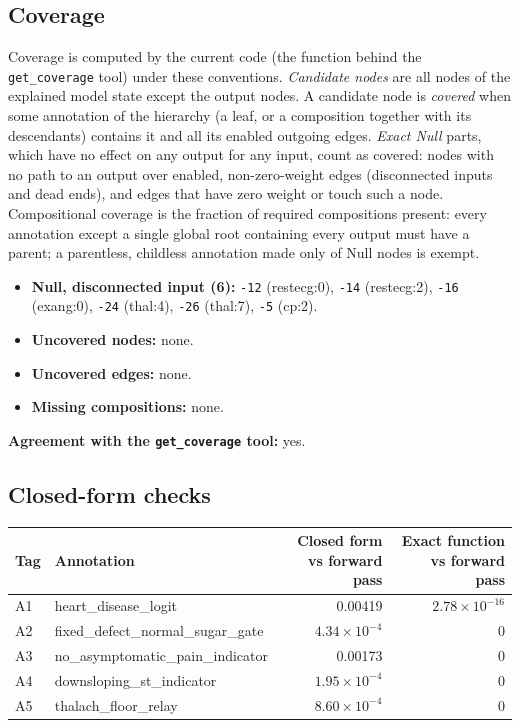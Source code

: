 \begin{drafted}
\subsection{Coverage}\label{app:heart-s4-c1:coverage}
Coverage is computed by the current code (the function behind the \texttt{get\_coverage} tool) under these conventions. \emph{Candidate nodes} are all nodes of the explained model state except the output nodes. A candidate node is \emph{covered} when some annotation of the hierarchy (a leaf, or a composition together with its descendants) contains it and all its enabled outgoing edges. \emph{Exact Null} parts, which have no effect on any output for any input, count as covered: nodes with no path to an output over enabled, non-zero-weight edges (disconnected inputs and dead ends), and edges that have zero weight or touch such a node. Compositional coverage is the fraction of required compositions present: every annotation except a single global root containing every output must have a parent; a parentless, childless annotation made only of Null nodes is exempt.

\begin{itemize}
\item \textbf{Null, disconnected input (6):} \texttt{-12} (restecg:0), \texttt{-14} (restecg:2), \texttt{-16} (exang:0), \texttt{-24} (thal:4), \texttt{-26} (thal:7), \texttt{-5} (cp:2).
\item \textbf{Uncovered nodes:} none.
\item \textbf{Uncovered edges:} none.
\item \textbf{Missing compositions:} none.
\end{itemize}
\noindent\textbf{Agreement with the \texttt{get\_coverage} tool:} yes.

\subsection{Closed-form checks}\label{app:heart-s4-c1:closedform}
{\small\noindent\begin{tabularx}{\linewidth}{@{}lXrr@{}}
\toprule Tag & Annotation & Closed form vs forward pass & Exact function vs forward pass \\ \midrule
A1 & heart\_\allowbreak{}disease\_\allowbreak{}logit & 0.00419 & $2.78\times 10^{-16}$ \\
A2 & fixed\_\allowbreak{}defect\_\allowbreak{}normal\_\allowbreak{}sugar\_\allowbreak{}gate & $4.34\times 10^{-4}$ & 0 \\
A3 & no\_\allowbreak{}asymptomatic\_\allowbreak{}pain\_\allowbreak{}indicator & 0.00173 & 0 \\
A4 & downsloping\_\allowbreak{}st\_\allowbreak{}indicator & $1.95\times 10^{-4}$ & 0 \\
A5 & thalach\_\allowbreak{}floor\_\allowbreak{}relay & $8.60\times 10^{-4}$ & 0 \\
\bottomrule
\end{tabularx}\par}

\end{drafted}
